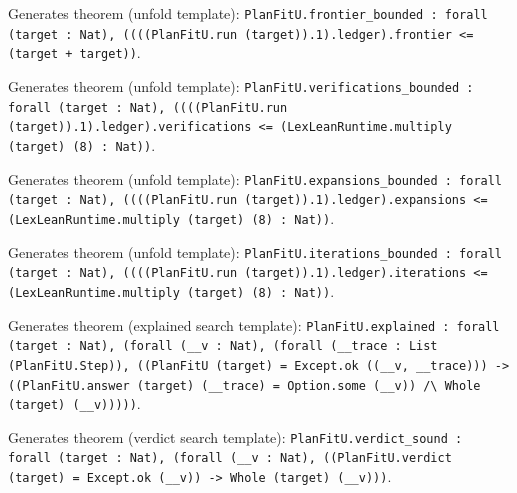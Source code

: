 \documentclass[11pt]{article}
\begin{document}
\noindent Generates theorem (unfold template): \texttt{PlanFitU.frontier\_bounded : forall (target : Nat), ((((PlanFitU.run (target)).1).ledger).frontier <= (target + target))}.\par
\noindent Generates theorem (unfold template): \texttt{PlanFitU.verifications\_bounded : forall (target : Nat), ((((PlanFitU.run (target)).1).ledger).verifications <= (LexLeanRuntime.multiply (target) (8) : Nat))}.\par
\noindent Generates theorem (unfold template): \texttt{PlanFitU.expansions\_bounded : forall (target : Nat), ((((PlanFitU.run (target)).1).ledger).expansions <= (LexLeanRuntime.multiply (target) (8) : Nat))}.\par
\noindent Generates theorem (unfold template): \texttt{PlanFitU.iterations\_bounded : forall (target : Nat), ((((PlanFitU.run (target)).1).ledger).iterations <= (LexLeanRuntime.multiply (target) (8) : Nat))}.\par
\noindent Generates theorem (explained search template): \texttt{PlanFitU.explained : forall (target : Nat), (forall (\_\_v : Nat), (forall (\_\_trace : List (PlanFitU.Step)), ((PlanFitU (target) = Except.ok ((\_\_v, \_\_trace))) -> ((PlanFitU.answer (target) (\_\_trace) = Option.some (\_\_v)) /\textbackslash{} Whole (target) (\_\_v)))))}.\par
\noindent Generates theorem (verdict search template): \texttt{PlanFitU.verdict\_sound : forall (target : Nat), (forall (\_\_v : Nat), ((PlanFitU.verdict (target) = Except.ok (\_\_v)) -> Whole (target) (\_\_v)))}.\par
\end{document}
